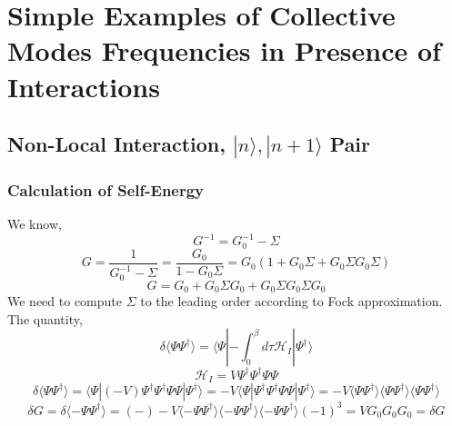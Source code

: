 



\chapter{Simple Examples of Collective Modes Frequencies in Presence of Interactions}
\section{Non-Local Interaction, $|n\rangle,|n+1\rangle$ Pair}
\label{Notes on unpublished calculations}
\setcounter{equation}{0}

\subsection{Calculation of Self-Energy}
We know,
\begin{equation}
G^{-1} = G_0^{-1} - \Sigma
\end{equation}
\begin{equation}
G = \frac{1}{{G_0^{-1}-\Sigma}}=\frac{G_0}{{1-G_0\Sigma}}=G_0(1+G_0\Sigma+G_0\Sigma G_0\Sigma)
\end{equation}
\begin{equation}
G=G_0 + G_0\Sigma G_0 + G_0\Sigma G_0\Sigma G_0
\end{equation}
We need to compute \(\Sigma\) to the leading order according to Fock approximation. \newline
The quantity, \[\delta
\langle\Psi\Psi^\dagger\rangle=\langle \Psi| -\int_0^\beta{d\tau\mathcal{H}_I}|\Psi^\dagger \rangle \]
\[\mathcal{H}_I=V\Psi^\dagger \Psi^\dagger \Psi \Psi \]
\[\delta\langle\Psi \Psi^\dagger \rangle = \langle \Psi| (-V) \Psi^\dagger \Psi^\dagger \Psi \Psi |\Psi^\dagger \rangle = -V \langle \Psi | \Psi^\dagger \Psi^\dagger \Psi \Psi | \Psi^\dagger \rangle = -V \langle \Psi \Psi^\dagger \rangle \langle \Psi \Psi^\dagger \rangle \langle \Psi \Psi^\dagger \rangle\]
\[\delta G = \delta \langle - \Psi \Psi^\dagger \rangle = (-)-V \langle -\Psi \Psi^\dagger \rangle \langle -\Psi \Psi^\dagger \rangle \langle -\Psi \Psi^\dagger \rangle (-1)^3 = V G_0 G_0 G_0 = \delta G\]

